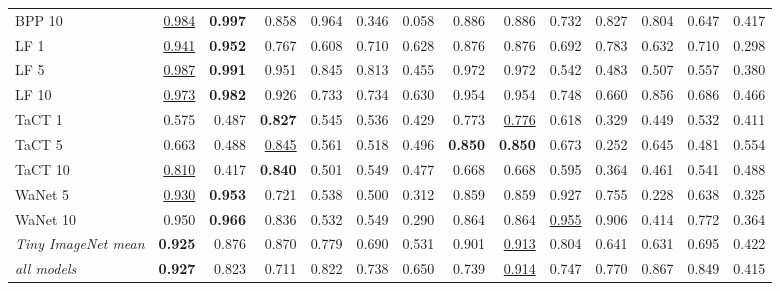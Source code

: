 \begin{table}[htbp]
\begin{adjustbox}{max width=\textwidth}
\begin{tabular}{lrrrrrrrrrrrrr}
BPP 10 & \underline{0.984} & \textbf{0.997} & 0.858 & 0.964 & \textcolor{black!45}{0.346} & \textcolor{black!45}{0.058} & 0.886 & 0.886 & 0.732 & 0.827 & 0.804 & 0.647 & \textcolor{black!45}{0.417} \\
LF 1 & \underline{0.941} & \textbf{0.952} & 0.767 & 0.608 & 0.710 & 0.628 & 0.876 & 0.876 & 0.692 & 0.783 & 0.632 & 0.710 & \textcolor{black!45}{0.298} \\
LF 5 & \underline{0.987} & \textbf{0.991} & 0.951 & 0.845 & 0.813 & \textcolor{black!45}{0.455} & 0.972 & 0.972 & 0.542 & \textcolor{black!45}{0.483} & 0.507 & 0.557 & \textcolor{black!45}{0.380} \\
LF 10 & \underline{0.973} & \textbf{0.982} & 0.926 & 0.733 & 0.734 & 0.630 & 0.954 & 0.954 & 0.748 & 0.660 & 0.856 & 0.686 & \textcolor{black!45}{0.466} \\
TaCT 1 & 0.575 & \textcolor{black!45}{0.487} & \textbf{0.827} & 0.545 & 0.536 & \textcolor{black!45}{0.429} & 0.773 & \underline{0.776} & 0.618 & \textcolor{black!45}{0.329} & \textcolor{black!45}{0.449} & 0.532 & \textcolor{black!45}{0.411} \\
TaCT 5 & 0.663 & \textcolor{black!45}{0.488} & \underline{0.845} & 0.561 & 0.518 & \textcolor{black!45}{0.496} & \textbf{0.850} & \textbf{0.850} & 0.673 & \textcolor{black!45}{0.252} & 0.645 & \textcolor{black!45}{0.481} & 0.554 \\
TaCT 10 & \underline{0.810} & \textcolor{black!45}{0.417} & \textbf{0.840} & 0.501 & 0.549 & \textcolor{black!45}{0.477} & 0.668 & 0.668 & 0.595 & \textcolor{black!45}{0.364} & \textcolor{black!45}{0.461} & 0.541 & \textcolor{black!45}{0.488} \\
WaNet 5 & \underline{0.930} & \textbf{0.953} & 0.721 & 0.538 & 0.500 & \textcolor{black!45}{0.312} & 0.859 & 0.859 & 0.927 & 0.755 & \textcolor{black!45}{0.228} & 0.638 & \textcolor{black!45}{0.325} \\
WaNet 10 & 0.950 & \textbf{0.966} & 0.836 & 0.532 & 0.549 & \textcolor{black!45}{0.290} & 0.864 & 0.864 & \underline{0.955} & 0.906 & \textcolor{black!45}{0.414} & 0.772 & \textcolor{black!45}{0.364} \\
\rowcolor{black!8}\emph{Tiny ImageNet mean} & \textbf{0.925} & 0.876 & 0.870 & 0.779 & 0.690 & 0.531 & 0.901 & \underline{0.913} & 0.804 & 0.641 & 0.631 & 0.695 & \textcolor{black!45}{0.422} \\
\rowcolor{black!8}\emph{all models} & \textbf{0.927} & 0.823 & 0.711 & 0.822 & 0.738 & 0.650 & 0.739 & \underline{0.914} & 0.747 & 0.770 & 0.867 & 0.849 & \textcolor{black!45}{0.415} \\
\bottomrule
\end{tabular}
\end{adjustbox}
\end{table}
